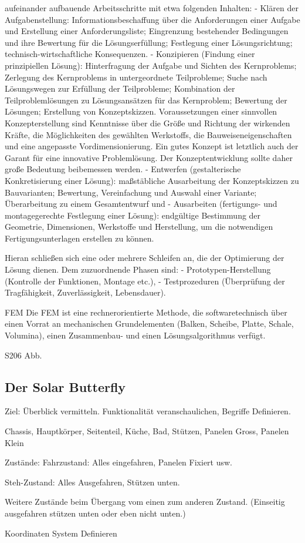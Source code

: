 aufeinander aufbauende Arbeitsschritte mit etwa folgenden Inhalten:
  - Klären der Aufgabenstellung: Informationsbeschaffung über die Anforderungen einer Aufgabe und Erstellung einer Anforderungsliste; Eingrenzung bestehender Bedingungen und ihre Bewertung für die Lösungserfüllung; Festlegung einer Lösungsrichtung; technisch-wirtschaftliche Konsequenzen.
  - Konzipieren (Findung einer prinzipiellen Lösung): Hinterfragung der Aufgabe und Sichten des Kernproblems; Zerlegung des Kernproblems in untergeordnete Teilprobleme; Suche nach Lösungswegen zur Erfüllung der Teilprobleme; Kombination der Teilproblemlösungen zu Lösungsansätzen für das Kernproblem; Bewertung der Lösungen; Erstellung von Konzeptskizzen.  Voraussetzungen einer sinnvollen Konzepterstellung sind Kenntnisse über die Größe und Richtung der wirkenden Kräfte, die Möglichkeiten des gewählten Werkstoffs, die Bauweiseneigenschaften und eine angepasste Vordimensionierung. Ein gutes Konzept ist letztlich auch der Garant für eine innovative Problemlösung. Der Konzeptentwicklung sollte daher große Bedeutung beibemessen werden.
  - Entwerfen (gestalterische Konkretisierung einer Lösung): maßstäbliche Ausarbeitung der Konzeptskizzen zu Bauvarianten; Bewertung, Vereinfachung und Auswahl einer Variante; Überarbeitung zu einem Gesamtentwurf und
  - Ausarbeiten (fertigungs- und montagegerechte Festlegung einer Lösung): endgültige Bestimmung der Geometrie, Dimensionen, Werkstoffe und Herstellung, um die notwendigen Fertigungsunterlagen erstellen zu können.

Hieran schließen sich eine oder mehrere Schleifen an, die der Optimierung der Lösung dienen. Dem zuzuordnende Phasen sind:
  - Prototypen-Herstellung (Kontrolle der Funktionen, Montage etc.),
  - Testprozeduren (Überprüfung der Tragfähigkeit, Zuverlässigkeit, Lebensdauer).

FEM
  Die FEM ist eine rechnerorientierte Methode, die softwaretechnisch über einen Vorrat an mechanischen Grundelementen (Balken, Scheibe, Platte, Schale, Volumina), einen Zusammenbau- und einen Lösungsalgorithmus verfügt.

S206 Abb.

\subsection{Der Solar Butterfly}
Ziel: Überblick vermitteln. Funktionalität veranschaulichen, Begriffe Definieren.

Chassis, Hauptkörper, Seitenteil, Küche, Bad, Stützen, Panelen Gross, Panelen Klein

Zustände:
Fahrzustand:
Alles eingefahren, Panelen Fixiert usw.


Steh-Zustand:
Alles Ausgefahren, Stützen unten.

Weitere Zustände beim Übergang vom einen zum anderen Zustand. (Einseitig ausgefahren stützen unten oder eben nicht unten.)

Koordinaten System Definieren
\newpage
